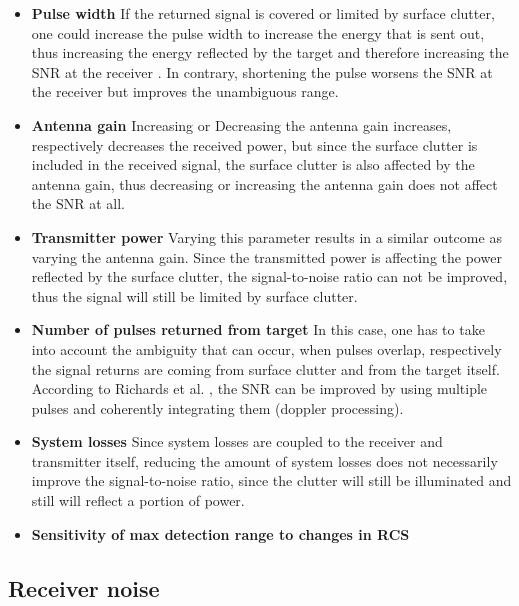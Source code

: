 \begin{itemize}
	\item \textbf{Pulse width}\newline
		If the returned signal is covered or limited by surface clutter, one could increase the pulse width to increase the energy that is sent out, thus increasing the energy reflected by the target and therefore increasing the SNR at the receiver \citep{richards2010principles}.
		In contrary, shortening the pulse worsens the SNR at the receiver but improves the unambiguous range.		
	\item \textbf{Antenna gain} \newline
		Increasing or Decreasing the antenna gain increases, respectively decreases the received power, but since the surface clutter is included in the received signal, the surface clutter is also affected by the antenna gain, thus decreasing or increasing the antenna gain does not affect the SNR at all.
	\item \textbf{Transmitter power}\newline
		Varying this parameter results in a similar outcome as varying the antenna gain. Since the transmitted power is affecting the power reflected by the surface clutter, the signal-to-noise ratio can not be improved, thus the signal will still be limited by surface clutter.
	\item \textbf{Number of pulses returned from target}\newline
		In this case, one has to take into account the ambiguity that can occur, when pulses overlap, respectively the signal returns are coming from surface clutter and from the target itself. According to Richards et al. \citep{richards2010principles}, the SNR can be improved by using multiple pulses and coherently integrating them (doppler processing).
	\item \textbf{System losses}\newline
		Since system losses are coupled to the receiver and transmitter itself, reducing the amount of system losses does not necessarily improve the signal-to-noise ratio, since the clutter will still be illuminated and still will reflect a portion of power.
	\item \textbf{Sensitivity of max detection range to changes in RCS}
		
\end{itemize}


\subsection{Receiver noise}

